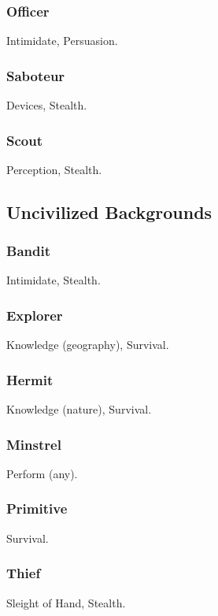 \subsubsection{Officer}
 Intimidate, Persuasion.

\subsubsection{Saboteur}
 Devices, Stealth.

\subsubsection{Scout}
 Perception, Stealth.

\subsection{Uncivilized Backgrounds}

\subsubsection{Bandit}
 Intimidate, Stealth.

\subsubsection{Explorer}
 Knowledge (geography), Survival.

\subsubsection{Hermit}
 Knowledge (nature), Survival.

\subsubsection{Minstrel}
 Perform (any).

\subsubsection{Primitive}
 Survival.

\subsubsection{Thief}
 Sleight of Hand, Stealth.
